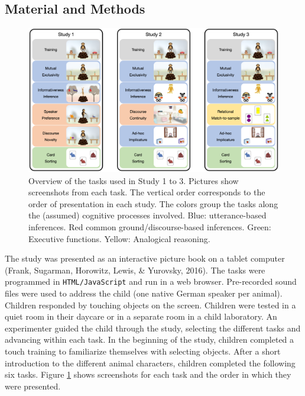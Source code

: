 \documentclass[
  man,floatsintext]{apa6}
\begin{document}
\hypertarget{material-and-methods}{%
\subsection{Material and Methods}\label{material-and-methods}}



\begin{figure}

{\centering \includegraphics[width=1\linewidth]{./figures/figure1} 

}

\caption{Overview of the tasks used in Study 1 to 3. Pictures show screenshots from each task. The vertical order corresponds to the order of presentation in each study. The colors group the tasks along the (assumed) cognitive processes involved. Blue: utterance-based inferences. Red common ground/discourse-based inferences. Green: Executive functions. Yellow: Analogical reasoning.}\label{fig:fig1}
\end{figure}

The study was presented as an interactive picture book on a tablet computer (Frank, Sugarman, Horowitz, Lewis, \& Yurovsky, 2016). The tasks were programmed in \texttt{HTML/JavaScript} and run in a web browser. Pre-recorded sound files were used to address the child (one native German speaker per animal). Children responded by touching objects on the screen. Children were tested in a quiet room in their daycare or in a separate room in a child laboratory. An experimenter guided the child through the study, selecting the different tasks and advancing within each task. In the beginning of the study, children completed a touch training to familiarize themselves with selecting objects. After a short introduction to the different animal characters, children completed the following six tasks. Figure \ref{fig:fig1} shows screenshots for each task and the order in which they were presented.
\end{document}
